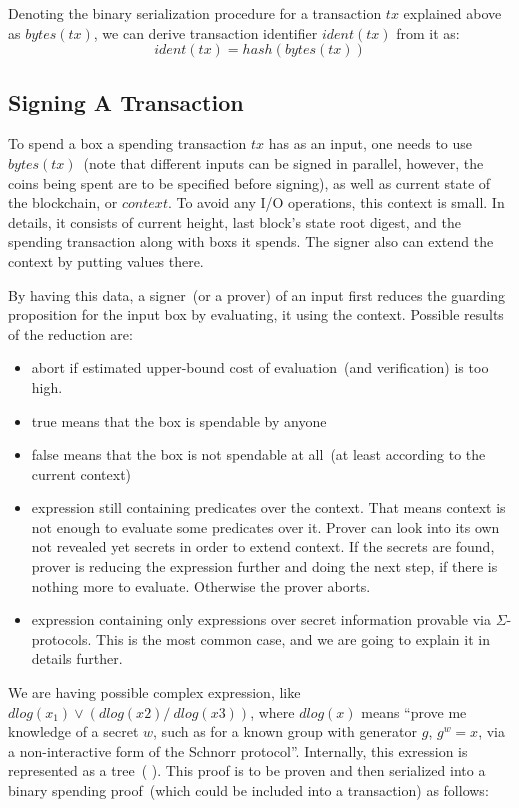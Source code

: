\documentclass[]{article}   %
\newcommand{\authnote}[2]{\marginpar{\parbox{\marginparwidth}{\tiny %
  \textsf{#1 {\textcolor{blue}{notes: #2}}}}}%
  \textcolor{blue}{\textbf{\dag}}}
\newcommand{\authnote}[2]{
  \textsf{#1 \textcolor{blue}{: #2}}}
\newcommand{\authnote}[2]{}
\newcommand{\knote}[1]{{\authnote{\textcolor{green}{Alex notes}}{#1}}}
\newcommand{\coin}{box}
\begin{document}
Denoting the binary serialization procedure for a transaction $tx$ explained above as $bytes(tx)$, we can derive
transaction identifier $ident(tx)$ from it as:
    $$ident(tx) = hash(bytes(tx))$$

\subsection{Signing A Transaction}

To spend a \coin{} a spending transaction $tx$ has as an input, one needs to use $bytes(tx)$~(note that different inputs
can be signed in parallel, however, the coins being spent are to be specified before signing), as well as current state
of the blockchain, or $context$. To avoid any I/O operations, this context is small. In details, it consists of current
height, last block's state root digest, and the spending transaction along with \coin{}s it spends. The signer also can
extend the context by putting values there.

By having this data, a signer~(or a prover) of an input first reduces the guarding proposition for the input \coin{} by
evaluating, it using the context. Possible results of the reduction are:

\begin{itemize}
    \item{abort} if estimated upper-bound cost of evaluation~(and verification) is too high.
    \item{true} means that the \coin{} is spendable by anyone
    \item{false} means that the \coin{} is not spendable at all~(at least according to the current context)
    \item{expression still containing predicates over the context. } That means context is not enough to evaluate
    some predicates over it. Prover can look into its own not revealed yet secrets in order to extend context. If the
    secrets are found, prover is reducing the expression further and doing the next step, if there is nothing more to
    evaluate. Otherwise the prover aborts.
    \item{expression containing only expressions over secret information provable via $\Sigma$-protocols. } This is the
    most common case, and we are going to explain it in details further.
\end{itemize}

We are having possible complex expression, like $dlog(x_1) \lor (dlog(x2) /\ dlog(x3))$, where $dlog(x)$ means ``prove me
knowledge of a secret $w$, such as for a known group with generator $g$, $g^w = x$, via a non-interactive form of the
Schnorr protocol''. Internally, this exression is represented as a tree~(\knote{draw the tree}). This proof is to be
proven and then serialized into a binary spending proof~(which could be included into a transaction) as follows:
\end{document}
